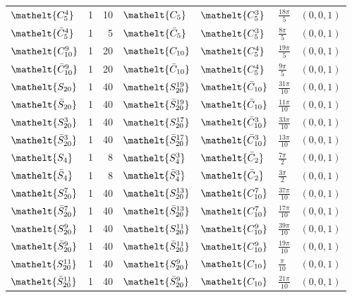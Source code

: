 \documentclass[10pt,a4paper]{article}
\numberwithin{equation}{section}
\newcommand{\eltfont}[1]{{\let\sigma\eltsigma\mathelt{#1}}}
\newcommand{\cls}[1]{\eltfont{#1}}
\newcommand{\dirvec}[3]{(#1, #2, #3)}
\newcommand{\barred}[1]{\bar{#1}}
\begin{document}
{\begin{longtable}{@{}lrrllll@{}}
$\cls{C_{5}^{4}}$ & 1 & 10 & $\cls{C_{5}}$ & $\cls{C_{5}^{3}}$ & $\tfrac{18\pi}{5}$ & $\dirvec{0}{0}{1}$\\
$\cls{\barred{C}_{5}^{4}}$ & 1 & 5 & $\cls{\barred{C}_{5}}$ & $\cls{C_{5}^{3}}$ & $\tfrac{8\pi}{5}$ & $\dirvec{0}{0}{1}$\\
$\cls{C_{10}^{9}}$ & 1 & 20 & $\cls{C_{10}}$ & $\cls{C_{5}^{4}}$ & $\tfrac{19\pi}{5}$ & $\dirvec{0}{0}{1}$\\
$\cls{\barred{C}_{10}^{9}}$ & 1 & 20 & $\cls{\barred{C}_{10}}$ & $\cls{C_{5}^{4}}$ & $\tfrac{9\pi}{5}$ & $\dirvec{0}{0}{1}$\\
$\cls{S_{20}}$ & 1 & 40 & $\cls{S_{20}^{19}}$ & $\cls{\barred{C}_{10}}$ & $\tfrac{31\pi}{10}$ & $\dirvec{0}{0}{1}$\\
$\cls{\barred{S}_{20}}$ & 1 & 40 & $\cls{\barred{S}_{20}^{19}}$ & $\cls{\barred{C}_{10}}$ & $\tfrac{11\pi}{10}$ & $\dirvec{0}{0}{1}$\\
$\cls{S_{20}^{3}}$ & 1 & 40 & $\cls{S_{20}^{17}}$ & $\cls{\barred{C}_{10}^{3}}$ & $\tfrac{33\pi}{10}$ & $\dirvec{0}{0}{1}$\\
$\cls{\barred{S}_{20}^{3}}$ & 1 & 40 & $\cls{\barred{S}_{20}^{17}}$ & $\cls{\barred{C}_{10}^{3}}$ & $\tfrac{13\pi}{10}$ & $\dirvec{0}{0}{1}$\\
$\cls{S_{4}}$ & 1 & 8 & $\cls{S_{4}^{3}}$ & $\cls{\barred{C}_{2}}$ & $\tfrac{7\pi}{2}$ & $\dirvec{0}{0}{1}$\\
$\cls{\barred{S}_{4}}$ & 1 & 8 & $\cls{\barred{S}_{4}^{3}}$ & $\cls{\barred{C}_{2}}$ & $\tfrac{3\pi}{2}$ & $\dirvec{0}{0}{1}$\\
$\cls{S_{20}^{7}}$ & 1 & 40 & $\cls{S_{20}^{13}}$ & $\cls{C_{10}^{7}}$ & $\tfrac{37\pi}{10}$ & $\dirvec{0}{0}{1}$\\
$\cls{\barred{S}_{20}^{7}}$ & 1 & 40 & $\cls{\barred{S}_{20}^{13}}$ & $\cls{C_{10}^{7}}$ & $\tfrac{17\pi}{10}$ & $\dirvec{0}{0}{1}$\\
$\cls{S_{20}^{9}}$ & 1 & 40 & $\cls{S_{20}^{11}}$ & $\cls{C_{10}^{9}}$ & $\tfrac{39\pi}{10}$ & $\dirvec{0}{0}{1}$\\
$\cls{\barred{S}_{20}^{9}}$ & 1 & 40 & $\cls{\barred{S}_{20}^{11}}$ & $\cls{C_{10}^{9}}$ & $\tfrac{19\pi}{10}$ & $\dirvec{0}{0}{1}$\\
$\cls{S_{20}^{11}}$ & 1 & 40 & $\cls{S_{20}^{9}}$ & $\cls{C_{10}}$ & $\tfrac{\pi}{10}$ & $\dirvec{0}{0}{1}$\\
$\cls{\barred{S}_{20}^{11}}$ & 1 & 40 & $\cls{\barred{S}_{20}^{9}}$ & $\cls{C_{10}}$ & $\tfrac{21\pi}{10}$ & $\dirvec{0}{0}{1}$\\

\end{longtable}}
\end{document}
